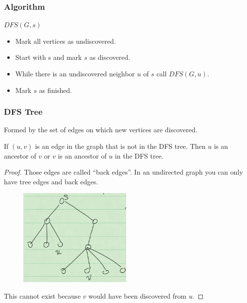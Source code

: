 \documentclass[en,hazy,blue,normal,12pt]{elegantnote}
\begin{document}
\subsubsection{Algorithm}
$DFS(G, s)$
\begin{itemize}
    \item Mark all vertices as undiscovered.
    \item Start with s and mark $s$ as discovered.
    \item While there is an undiscovered neighbor $u$ of $s$ call $DFS(G, u)$.
    \item Mark $s$ as finished.
\end{itemize}

\subsubsection{DFS Tree}
Formed by the set of edges on which new vertices are discovered. 

\begin{theorem}
If $(u, v)$ is an edge in the graph that is not in the DFS tree. Then $u$ is 
an ancestor of $v$ or $v$ is an ancestor of $u$ in the DFS tree.
\end{theorem}

\begin{proof}
Those edges are called ``back edges''. In an undirected graph you can only 
have tree edges and back edges.
\begin{figure}[H]
\centering
\includegraphics[width=0.5\textwidth]{dfs.png}
\end{figure}
This cannot exist because $v$ would have been discovered from $u$.
\end{proof}
\end{document}
